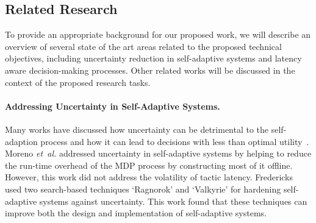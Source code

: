 \documentclass[12pt]{article}
\newcommand{\etal}{\emph{et~al.}\xspace}
\begin{document}




\subsection{Related Research} %



To provide an appropriate background for our proposed work, we will describe an overview of several state of the art areas related to the proposed technical objectives, including uncertainty reduction in self-adaptive systems and latency aware decision-making processes. Other related works will be discussed in the context of the proposed research tasks. %


\vspace{-3mm}\paragraph{Addressing Uncertainty in Self-Adaptive Systems.} Many works have discussed how uncertainty can be detrimental to the self-adaption process and how it can lead to decisions with less than optimal utility~\cite{calinescu2011dynamic, camara2017reasoning, esfahani2013uncertainty}. Moreno \etal\cite{moreno2016efficient} addressed uncertainty in self-adaptive systems by helping to reduce the run-time overhead of the MDP process by constructing most of it offline. However, this work did not address the volatility of tactic latency. Fredericks~\cite{Fredericks:2016:AHS:2897053.2897059} used two search-based techniques `Ragnorok' and `Valkyrie' for hardening self-adaptive systems against uncertainty. This work found that these techniques can improve both the design and implementation of self-adaptive systems.
\end{document}
